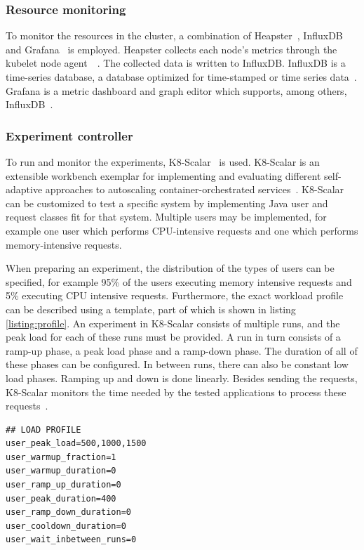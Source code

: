 \subsubsection{Resource monitoring}
To monitor the resources in the cluster, a combination of Heapster~\citep{heapster}, InfluxDB~\citep{influxdb} and Grafana~\citep{grafana} is employed. Heapster collects each node's metrics through the kubelet node agent~\citep{kubelet}~\citep{heapster-influxdb-grafana}. The collected data is written to InfluxDB. InfluxDB is a time-series database, a database optimized for time-stamped or time series data~\citep{timeseriesdb}. Grafana is a metric dashboard and graph editor which supports, among others, InfluxDB~\citep{grafana-github}. 

\subsubsection{Experiment controller}
To run and monitor the experiments, K8-Scalar~\citep{scalar} is used. K8-Scalar is an extensible workbench exemplar for implementing and evaluating different self-adaptive approaches to autoscaling container-orchestrated services~\citep{scalar-github-overview}. K8-Scalar can be customized to test a specific system by implementing Java user and request classes fit for that system. Multiple users may be implemented, for example one user which performs CPU-intensive requests and one which performs memory-intensive requests.

When preparing an experiment, the distribution of the types of users can be specified, for example 95\% of the users executing memory intensive requests and 5\% executing CPU intensive requests. Furthermore, the exact workload profile can be described using a template, part of which is shown in listing \ref{listing:profile}. An experiment in K8-Scalar consists of multiple runs, and the peak load for each of these runs must be provided. A run in turn consists of a ramp-up phase, a peak load phase and a ramp-down phase. The duration of all of these phases can be configured. In between runs, there can also be constant low load phases. Ramping up and down is done linearly. Besides sending the requests, K8-Scalar monitors the time needed by the tested applications to process these requests~\citep{scalar}.

\begin{lstlisting}[float]
## LOAD PROFILE
user_peak_load=500,1000,1500
user_warmup_fraction=1
user_warmup_duration=0
user_ramp_up_duration=0
user_peak_duration=400
user_ramp_down_duration=0
user_cooldown_duration=0
user_wait_inbetween_runs=0
\end{lstlisting}

